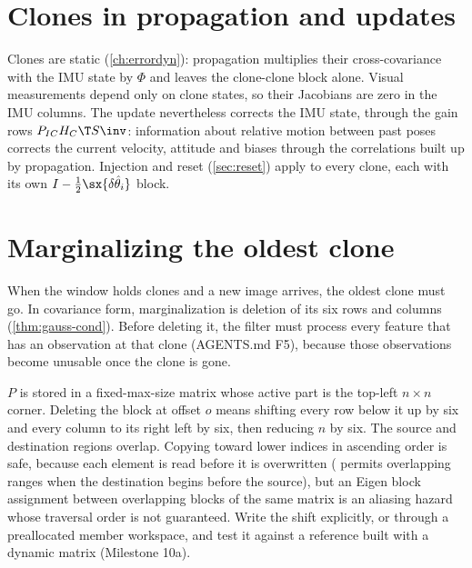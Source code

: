 \section{Clones in propagation and updates}

Clones are static (\cref{ch:errordyn}): propagation multiplies their cross-covariance with the IMU state by $\Phi$ and leaves the
clone-clone block alone. Visual measurements depend only on clone states, so their Jacobians are zero in the IMU columns.
The update nevertheless corrects the IMU state, through the gain rows $P_{IC}H_C\T S\inv$: information about relative motion
between past poses corrects the current velocity, attitude and biases through the correlations built up by propagation.
Injection and reset (\cref{sec:reset}) apply to every clone, each with its own $I - \tfrac12\sx{\delta\hat\theta_i}$ block.

\section{Marginalizing the oldest clone}

When the window holds  clones and a new image arrives, the oldest clone must go. In covariance form,
marginalization is deletion of its six rows and columns (\cref{thm:gauss-cond}). Before deleting it, the filter must process
every feature that has an observation at that clone (AGENTS.md F5), because those observations become unusable once
the clone is gone.

\begin{implnote}
$P$ is stored in a fixed-max-size matrix whose active part is the top-left $n\times n$ corner. Deleting the block at offset $o$
means shifting every row below it up by six and every column to its right left by six, then reducing $n$ by six. The source
and destination regions overlap. Copying toward lower indices in ascending order is safe, because each element is read
before it is overwritten ( permits overlapping ranges when the destination begins before the source), but an
Eigen block assignment between overlapping blocks of the same matrix is an aliasing hazard whose traversal order is not
guaranteed. Write the shift explicitly, or through a preallocated member workspace, and test it against a reference built
with a dynamic matrix (Milestone 10a).
\end{implnote}

